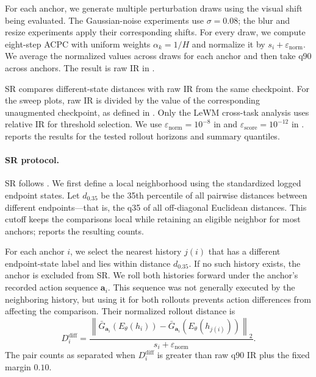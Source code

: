 \documentclass[10pt]{article}
\begin{document}
For each anchor, we generate multiple perturbation draws using the visual
shift being evaluated. The Gaussian-noise experiments use $\sigma=0.08$; the
blur and resize experiments apply their corresponding shifts. For every draw,
we compute eight-step ACPC with uniform weights $\alpha_k=1/H$ and normalize it
by $s_i+\varepsilon_{\mathrm{norm}}$. We average the normalized values across
draws for each anchor and then take q90 across anchors. The result is raw IR in
.

SR compares different-state distances with raw IR from the same checkpoint.
For the sweep plots, raw IR is divided by the value of the corresponding
unaugmented checkpoint, as defined in . Only the LeWM
cross-task analysis uses relative IR for threshold selection. We use
$\varepsilon_{\mathrm{norm}}=10^{-8}$ in
 and
$\varepsilon_{\mathrm{score}}=10^{-12}$ in .
 reports the results for the tested
rollout horizons and summary quantiles.



\paragraph{SR protocol.}
SR follows . We first define a local neighborhood using the
standardized logged endpoint states. Let $d_{0.35}$ be the 35th percentile of
all pairwise distances between different endpoints---that is, the q35 of all off-diagonal Euclidean distances.
This cutoff keeps the comparisons local while retaining an eligible neighbor for most anchors;
 reports the resulting counts.

For each anchor $i$, we select the nearest history $j(i)$ that has a different
endpoint-state label and lies within distance $d_{0.35}$. If no such history
exists, the anchor is excluded from SR. We roll both histories forward under
the anchor's recorded action sequence $\mathbf a_i$. This sequence was not
generally executed by the neighboring history, but using it for both rollouts
prevents action differences from affecting the comparison. Their normalized
rollout distance is
\begin{equation}
D_i^{\mathrm{diff}}
=
\frac{
\left\|\bar G_{\mathbf a_i}(E_\theta(h_i))
-\bar G_{\mathbf a_i}(E_\theta(h_{j(i)}))\right\|_2
}{s_i+\varepsilon_{\mathrm{norm}}}.
\label{eq:different-state-distance}
\end{equation}
The pair counts as separated when $D_i^{\mathrm{diff}}$ is greater than raw
q90 IR plus the fixed margin $0.10$.
\end{document}
